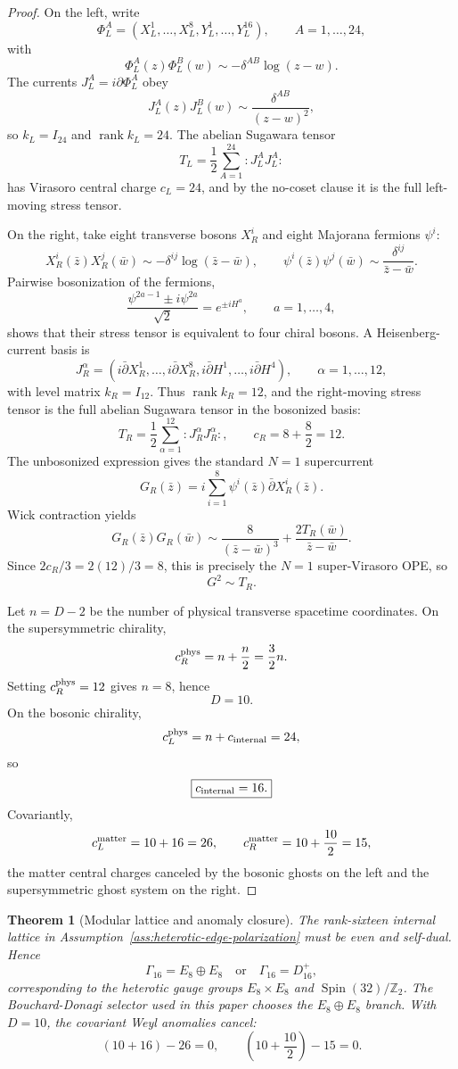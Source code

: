 \documentclass[11pt]{article}
\newtheorem{theorem}{Theorem}[section]
\theoremstyle{remark}
\theoremstyle{plain}
\newcommand{\Z}{\mathbb Z}
\begin{document}
\begin{proof}
On the left, write
\[
\Phi_L^A=(X_L^1,\ldots,X_L^8,Y_L^1,\ldots,Y_L^{16}),
\qquad
A=1,\ldots,24,
\]
with
\[
\Phi_L^A(z)\Phi_L^B(w)\sim-\delta^{AB}\log(z-w).
\]
The currents \(J_L^A=i\partial\Phi_L^A\) obey
\[
J_L^A(z)J_L^B(w)\sim\frac{\delta^{AB}}{(z-w)^2},
\]
so \(k_L=I_{24}\) and \(\operatorname{rank}k_L=24\). The abelian Sugawara tensor
\[
T_L=\frac12\sum_{A=1}^{24}:J_L^AJ_L^A:
\]
has Virasoro central charge \(c_L=24\), and by the no-coset clause it is the full left-moving stress
tensor.

On the right, take eight transverse bosons \(X_R^i\) and eight Majorana fermions \(\psi^i\):
\[
X_R^i(\bar z)X_R^j(\bar w)\sim-\delta^{ij}\log(\bar z-\bar w),
\qquad
\psi^i(\bar z)\psi^j(\bar w)\sim\frac{\delta^{ij}}{\bar z-\bar w}.
\]
Pairwise bosonization of the fermions,
\[
\frac{\psi^{2a-1}\pm i\psi^{2a}}{\sqrt2}=e^{\pm iH^a},
\qquad
a=1,\ldots,4,
\]
shows that their stress tensor is equivalent to four chiral bosons. A Heisenberg-current basis is
\[
J_R^\alpha=
\left(
i\bar\partial X_R^1,\ldots,i\bar\partial X_R^8,
i\bar\partial H^1,\ldots,i\bar\partial H^4
\right),
\qquad
\alpha=1,\ldots,12,
\]
with level matrix \(k_R=I_{12}\). Thus \(\operatorname{rank}k_R=12\), and the right-moving stress
tensor is the full abelian Sugawara tensor in the bosonized basis:
\[
T_R=\frac12\sum_{\alpha=1}^{12}:J_R^\alpha J_R^\alpha:,
\qquad
c_R=8+\frac82=12.
\]
The unbosonized expression gives the standard \(N=1\) supercurrent
\[
G_R(\bar z)=i\sum_{i=1}^{8}\psi^i(\bar z)\bar\partial X_R^i(\bar z).
\]
Wick contraction yields
\[
G_R(\bar z)G_R(\bar w)
\sim
\frac{8}{(\bar z-\bar w)^3}
+
\frac{2T_R(\bar w)}{\bar z-\bar w}.
\]
Since \(2c_R/3=2(12)/3=8\), this is precisely the \(N=1\) super-Virasoro OPE, so
\[
G^2\sim T_R.
\]

Let \(n=D-2\) be the number of physical transverse spacetime coordinates. On the supersymmetric
chirality,
\[
c_R^{\rm phys}=n+\frac n2=\frac32 n.
\]
Setting \(c_R^{\rm phys}=12\) gives \(n=8\), hence
\[
\boxed{D=10.}
\]
On the bosonic chirality,
\[
c_L^{\rm phys}=n+c_{\rm internal}=24,
\]
so
\[
\boxed{c_{\rm internal}=16.}
\]
Covariantly,
\[
c_L^{\rm matter}=10+16=26,
\qquad
c_R^{\rm matter}=10+\frac{10}{2}=15,
\]
the matter central charges canceled by the bosonic ghosts on the left and the
supersymmetric ghost system on the right.
\end{proof}

\begin{theorem}[Modular lattice and anomaly closure]
The rank-sixteen internal lattice in Assumption~\ref{ass:heterotic-edge-polarization} must be even
and self-dual. Hence
\[
\Gamma_{16}=E_8\oplus E_8
\quad\text{or}\quad
\Gamma_{16}=D_{16}^{+},
\]
corresponding to the heterotic gauge groups \(E_8\times E_8\) and
\(\operatorname{Spin}(32)/\Z_2\). The Bouchard-Donagi selector used in this paper chooses the
\(E_8\oplus E_8\) branch. With \(D=10\), the covariant Weyl anomalies cancel:
\[
(10+16)-26=0,
\qquad
\left(10+\frac{10}{2}\right)-15=0.
\]
\end{theorem}
\end{document}
